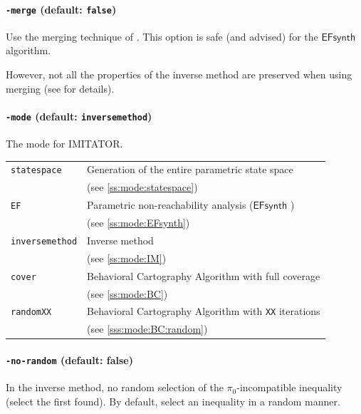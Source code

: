 \documentclass[a4paper,11pt]{report}
\newcommand{\pio}{\pi_0}
\newcommand{\EFsynth}{\ensuremath{\mathsf{EFsynth}}}
\newcommand{\imitator}{\textsf{IMITATOR}}
\newcommand{\code}[1]{\textbf{\texttt{#1}}}
\newcommand{\styleOption}[1]{\textcolor{optioncolor}{\texttt{#1}}}
\begin{document}
\paragraph{\styleOption{-merge} (default: \code{false})}
Use the merging technique of \cite{AFS13atva}.
This option is safe (and advised) for the \EFsynth{} algorithm.

However, not all the properties of the inverse method are preserved when using merging (see \cite{AFS13atva} for details).



\paragraph{\styleOption{-mode} (default: \styleOption{inversemethod})}
The mode for \imitator{}.

\begin{tabular}{@{} l @{\ \ } l}
	\styleOption{statespace} & Generation of the entire parametric state space \\
	& (see \cref{ss:mode:statespace}) \\
	
	\styleOption{EF} & Parametric non-reachability analysis (\EFsynth{} \cite{JLR15}) \\
	& (see \cref{ss:mode:EFsynth}) \\
	
	\styleOption{inversemethod} & Inverse method \\
	& (see \cref{ss:mode:IM}) \\
	
	\styleOption{cover} & Behavioral Cartography Algorithm with full coverage \\
	& (see \cref{ss:mode:BC}) \\
	
	\styleOption{randomXX} & Behavioral Cartography Algorithm with \styleOption{XX} iterations \\
	& (see \cref{sss:mode:BC:random}) \\
\end{tabular}



\paragraph{\styleOption{-no-random} (default: false)}
In the inverse method, no random selection of the $\pio$-incompatible inequality (select the first found).
By default, select an inequality in a random manner.
\end{document}
